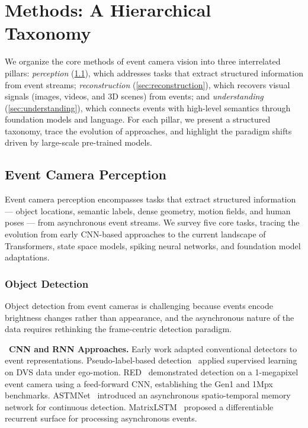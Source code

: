 \section{Methods: A Hierarchical Taxonomy}
\label{sec:method}

We organize the core methods of event camera vision into three interrelated pillars: \textit{perception} (\cref{sec:perception}), which addresses tasks that extract structured information from event streams; \textit{reconstruction} (\cref{sec:reconstruction}), which recovers visual signals (images, videos, and 3D scenes) from events; and \textit{understanding} (\cref{sec:understanding}), which connects events with high-level semantics through foundation models and language. For each pillar, we present a structured taxonomy, trace the evolution of approaches, and highlight the paradigm shifts driven by large-scale pre-trained models.


\subsection{Event Camera Perception}
\label{sec:perception}

Event camera perception encompasses tasks that extract structured information --- object locations, semantic labels, dense geometry, motion fields, and human poses --- from asynchronous event streams. We survey five core tasks, tracing the evolution from early CNN-based approaches to the current landscape of Transformers, state space models, spiking neural networks, and foundation model adaptations.


\subsubsection{Object Detection}
\label{sec:perception_det}

Object detection from event cameras is challenging because events encode brightness changes rather than appearance, and the asynchronous nature of the data requires rethinking the frame-centric detection paradigm.

\noindent{}~\textbf{CNN and RNN Approaches.} Early work adapted conventional detectors to event representations. Pseudo-label-based detection~\cite{iacono2018dvs} applied supervised learning on DVS data under ego-motion. RED~\cite{perot2020red} demonstrated detection on a 1-megapixel event camera using a feed-forward CNN, establishing the Gen1 and 1Mpx benchmarks. ASTMNet~\cite{li2022astmnet} introduced an asynchronous spatio-temporal memory network for continuous detection. MatrixLSTM~\cite{cannici2020matrixlstm} proposed a differentiable recurrent surface for processing asynchronous events.

